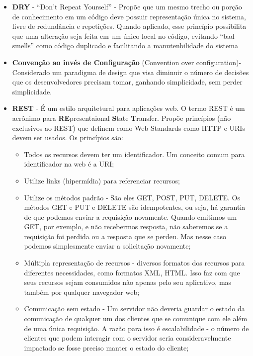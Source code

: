 \begin{itemize}
\item \textbf{DRY} - “Don’t Repeat Yourself” - Propõe que um mesmo trecho ou porção de
conhecimento em um código deve possuir representação única no sistema, livre de
redundância e repetições. Quando aplicado, esse princípio possibilita que uma alteração
seja feita em um único local no código, evitando “bad smells” como código duplicado e
facilitando a manutenbilidade do sistema
\item \textbf{Convenção ao invés de Configuração} (Convention over configuration)- Considerado um paradigma de design que visa diminuir o número de decisões que os desenvolvedores precisam tomar, ganhando simplicidade, sem perder simplicidade.
\item \textbf{REST} - É um estilo arquitetural para aplicações web. O termo REST é um acrônimo para \textbf{RE}presentaional \textbf{S}tate \textbf{T}ransfer. Propõe princípios (não exclusivos ao REST) que definem como Web Standards como HTTP e URIs devem ser usados. Os princípios são:
  \begin{itemize}
  \item Todos os recursos devem ter um identificador. Um conceito comum para identificador na web é a URI;
  \item Utilize links (hipermídia) para referenciar recursos;
  \item Utilize os métodos padrão - São eles GET, POST, PUT, DELETE. Os métodos GET e PUT e DELETE são idempotentes, ou seja, há garantia de que podemos enviar a requisição novamente. Quando emitimos um GET, por exemplo, e não recebermos resposta, não saberemos se a requisição foi perdida ou a resposta que se perdeu. Mas nesse caso podemos simplesmente enviar a solicitação novamente;
  \item Múltipla representação de recursos - diversos formatos dos recursos para diferentes necessidades, como formatos XML, HTML. Isso faz com que seus recursos sejam consumidos não apenas pelo seu aplicativo, mas também por qualquer navegador web;
  \item Comunicação sem estado - Um servidor não deveria guardar o estado da comunicação de qualquer um dos clientes que se comunique com ele além de uma única requisição. A razão para isso é escalabilidade - o número de clientes que podem interagir com o servidor seria consideravelmente impactado se fosse preciso manter o estado do cliente;
  \end{itemize}
\end{itemize}


